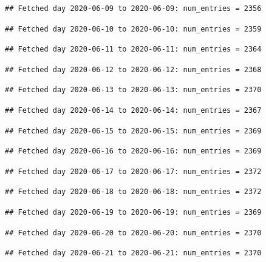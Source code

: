 \documentclass[]{article}
\begin{document}
\begin{verbatim}
## Fetched day 2020-06-09 to 2020-06-09: num_entries = 2356
\end{verbatim}

\begin{verbatim}
## Fetched day 2020-06-10 to 2020-06-10: num_entries = 2359
\end{verbatim}

\begin{verbatim}
## Fetched day 2020-06-11 to 2020-06-11: num_entries = 2364
\end{verbatim}

\begin{verbatim}
## Fetched day 2020-06-12 to 2020-06-12: num_entries = 2368
\end{verbatim}

\begin{verbatim}
## Fetched day 2020-06-13 to 2020-06-13: num_entries = 2370
\end{verbatim}

\begin{verbatim}
## Fetched day 2020-06-14 to 2020-06-14: num_entries = 2367
\end{verbatim}

\begin{verbatim}
## Fetched day 2020-06-15 to 2020-06-15: num_entries = 2369
\end{verbatim}

\begin{verbatim}
## Fetched day 2020-06-16 to 2020-06-16: num_entries = 2369
\end{verbatim}

\begin{verbatim}
## Fetched day 2020-06-17 to 2020-06-17: num_entries = 2372
\end{verbatim}

\begin{verbatim}
## Fetched day 2020-06-18 to 2020-06-18: num_entries = 2372
\end{verbatim}

\begin{verbatim}
## Fetched day 2020-06-19 to 2020-06-19: num_entries = 2369
\end{verbatim}

\begin{verbatim}
## Fetched day 2020-06-20 to 2020-06-20: num_entries = 2370
\end{verbatim}

\begin{verbatim}
## Fetched day 2020-06-21 to 2020-06-21: num_entries = 2370
\end{verbatim}
\end{document}
